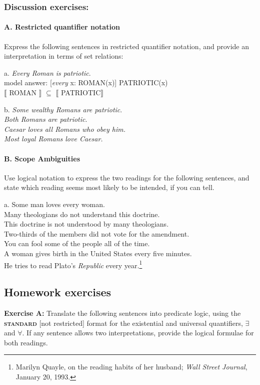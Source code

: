 \subsubsection{Discussion exercises:}\label{sec:}
\paragraph{A. Restricted quantifier notation} 

Express the following sentences in restricted quantifier notation, and provide an interpretation in terms of set relations:

\ea
  a. \textit{Every Roman is patriotic}.\\
\textsf{  model answer: [}\textsf{\textit{every}}\textsf{ x: ROMAN(x)] PATRIOTIC(x)\\} $\llbracket$ \textsf{ROMAN} $\rrbracket$ \textsf{} ${\subseteq}$\textsf{} $\llbracket$ \textsf{PATRIOTIC}$\rrbracket$ 
\z

\ea
  b. \textit{Some wealthy Romans are patriotic}.\\
\ex \textit{Both Romans are patriotic}.\\
\ex \textit{Caesar loves all Romans who obey him.}\\
\ex \textit{Most loyal Romans love Caesar.}
\z

\paragraph{B. Scope Ambiguities}

Use logical notation to express the two readings for the following sentences, and state which reading seems most likely to be intended, if you can tell.

\ea
  a. Some man loves every woman.\\
\ex Many theologians do not understand this doctrine.\\
\ex This doctrine is not understood by many theologians.\\
\ex Two-thirds of the members did not vote for the amendment.\\
\ex You can fool some of the people all of the time.\\
\ex A woman gives birth in the United States every five minutes.\\
\ex He tries to read Plato’s \textit{Republic} every year.\footnote{Marilyn Quayle, on the reading habits of her husband; \textit{Wall Street Journal}, January 20, 1993.}
\z

\subsection*{Homework exercises}\label{sec:}
\begin{stylepoints}
\textbf{Exercise A:} Translate the following sentences into predicate logic, using the \textbf{\textsc{standard}} [not restricted] format for the existential and universal quantifiers, ${\exists}$ and ${\forall}$. If any sentence allows two interpretations, provide the logical formulae for both readings.
\end{stylepoints}

